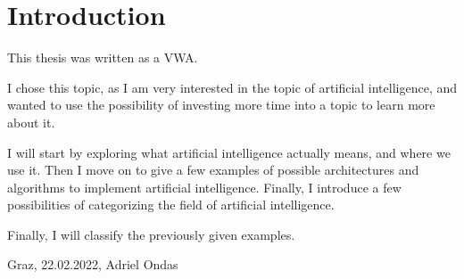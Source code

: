 \chapter{Introduction}
This thesis was written as a VWA.

I chose this topic, as I am very interested in the topic of artificial intelligence, and wanted to use the possibility of investing more time into a topic to learn more about it.

I will start by exploring what artificial intelligence actually means, and where we use it. Then I move on to give a few examples of possible architectures and algorithms to implement artificial intelligence. Finally, I introduce a few possibilities of categorizing the field of artificial intelligence.

Finally, I will classify the previously given examples.

Graz, 22.02.2022, Adriel Ondas